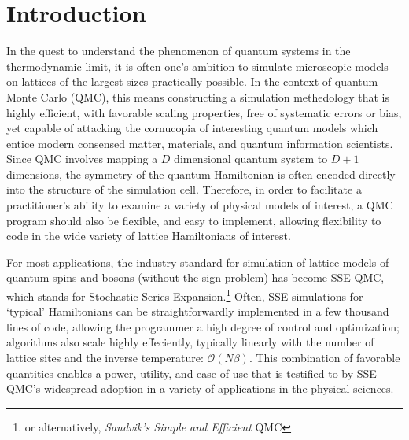 \documentclass[vecphys]{svmult}
\begin{document}
\section{Introduction}
\label{sec:1}
In the quest to understand the phenomenon of quantum systems in the thermodynamic limit, it is often one's ambition to simulate
microscopic models on lattices of the largest sizes practically possible.  In the context of quantum Monte Carlo (QMC), this means
constructing a simulation methedology that is highly efficient, with favorable scaling properties, free of systematic errors or bias, yet capable of attacking the cornucopia of interesting quantum models which entice modern consensed matter, materials, and quantum information scientists.
Since QMC involves mapping a $D$ dimensional quantum system to $D+1$ dimensions, the symmetry of the quantum Hamiltonian is often encoded directly into the structure of the simulation cell.  Therefore, in order to facilitate a practitioner's ability to examine a variety of physical models of interest, a QMC program should also be flexible, and easy to implement, allowing flexibility to code in the wide variety of lattice Hamiltonians of interest. %

For most applications, the industry standard for simulation of lattice models of quantum spins and bosons (without the sign problem) has become SSE QMC, which stands for Stochastic Series Expansion.\footnote{or alternatively, \textit{Sandvik's Simple and Efficient} QMC}   Often, SSE simulations for \lq typical' Hamiltonians can be straightforwardly implemented in a few thousand lines of code, allowing the programmer a high degree of control and optimization; algorithms also scale highly effeciently, typically linearly with the number of lattice sites and the inverse temperature: $\mathcal{O}(N\beta)$.  This combination of favorable quantities enables a power, utility, and ease of use that is testified to by SSE QMC's widespread adoption in a variety of applications in the physical sciences.
\end{document}
